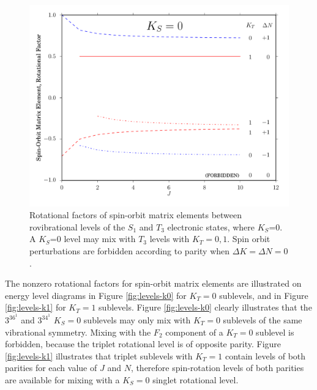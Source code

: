 \begin{figure}
  \caption{Rotational factors of spin-orbit matrix elements between
    rovibrational levels of the $S_1$ and $T_3$ electronic states,
    where $K_S$=0.  A $K_S$=0 level may mix with $T_3$ levels with
    $K_T=0,1$.  Spin orbit perturbations are forbidden according to
    parity when $\Delta K = \Delta N = 0$.}
  \label{fig:rotational-factors}
  \centering
  \includegraphics[width=6in]{rotational-factors-k0.pdf}
\end{figure}


The nonzero rotational factors for spin-orbit matrix elements are
illustrated on energy level diagrams in Figure \ref{fig:levels-k0} for
$K_T=0$ sublevels, and in Figure \ref{fig:levels-k1} for $K_T=1$
sublevels.  Figure \ref{fig:levels-k0} clearly illustrates that the
$3^36^1$ and $3^34^1$ $K_S=0$ sublevels may only mix with $K_T=0$
sublevels of the same vibrational symmetry.  Mixing with the $F_2$
component of a $K_T=0$ sublevel is forbidden, because the triplet
rotational level is of opposite parity.  Figure \ref{fig:levels-k1}
illustrates that triplet sublevels with $K_T=1$ contain levels of both
parities for each value of $J$ and $N$, therefore spin-rotation levels
of both parities are available for mixing with a $K_S=0$ singlet
rotational level.




